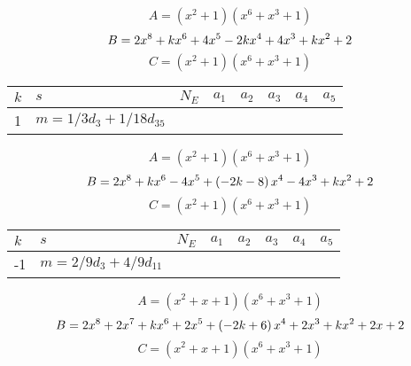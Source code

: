 \documentclass{amsart}
\begin{document}
$$A=(x^2
 + 1)(x^6
 + x^3
 + 1)$$
$$B=2\*x^8
 + k\*x^6
 + 4\*x^5
 - 2\*k\*x^4
 + 4\*x^3
 + k\*x^2
 + 2$$
$$C=(x^2
 + 1)(x^6
 + x^3
 + 1)$$
\begin{longtable}{|l|l|l|lllll|}
\hline
$k$ & $s$ & $N_E$ & $a_1$ & $a_2$ & $a_3$ & $a_4$ & $a_5$\\
\hline
1&$m=1/3d_{3}+1/18d_{35}$&&\multicolumn{5}{c|}{}\\
\hline
\end{longtable}
$$A=(x^2
 + 1)(x^6
 + x^3
 + 1)$$
$$B=2\*x^8
 + k\*x^6
 - 4\*x^5
 + \left(-2\*k
 - 8\right) \*x^4
 - 4\*x^3
 + k\*x^2
 + 2$$
$$C=(x^2
 + 1)(x^6
 + x^3
 + 1)$$
\begin{longtable}{|l|l|l|lllll|}
\hline
$k$ & $s$ & $N_E$ & $a_1$ & $a_2$ & $a_3$ & $a_4$ & $a_5$\\
\hline
-1&$m=2/9d_{3}+4/9d_{11}$&&\multicolumn{5}{c|}{}\\
\hline
\end{longtable}
$$A=(x^2
 + x
 + 1)(x^6
 + x^3
 + 1)$$
$$B=2\*x^8
 + 2\*x^7
 + k\*x^6
 + 2\*x^5
 + \left(-2\*k
 + 6\right) \*x^4
 + 2\*x^3
 + k\*x^2
 + 2\*x
 + 2$$
$$C=(x^2
 + x
 + 1)(x^6
 + x^3
 + 1)$$
\end{document}
